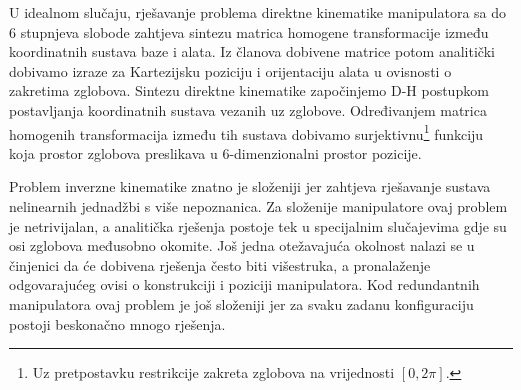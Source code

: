 \documentclass[times, utf8, diplomski, numeric]{fer}
\begin{document}
U idealnom slučaju, rješavanje problema direktne kinematike manipulatora sa do 6 stupnjeva slobode zahtjeva sintezu matrica homogene transformacije između koordinatnih sustava baze i alata.
Iz članova dobivene matrice potom analitički dobivamo izraze za Kartezijsku poziciju i orijentaciju alata u ovisnosti o zakretima zglobova.
Sintezu direktne kinematike započinjemo D-H postupkom \cite{uicker1964iterative} postavljanja koordinatnih sustava vezanih uz zglobove.
Određivanjem matrica homogenih transformacija između tih sustava dobivamo surjektivnu\footnote{Uz pretpostavku restrikcije zakreta zglobova na vrijednosti $[0,2\pi]$.} funkciju koja prostor zglobova preslikava u 6-dimenzionalni prostor pozicije.

Problem inverzne kinematike znatno je složeniji jer zahtjeva rješavanje sustava nelinearnih jednadžbi s više nepoznanica.
Za složenije manipulatore  ovaj problem je netrivijalan, a analitička rješenja postoje tek u specijalnim slučajevima gdje su osi zglobova međusobno okomite.
Još jedna otežavajuća okolnost nalazi se u činjenici da će dobivena rješenja često biti višestruka, a pronalaženje odgovarajućeg ovisi o konstrukciji i poziciji manipulatora.
Kod redundantnih manipulatora ovaj problem je još složeniji jer za svaku zadanu konfiguraciju postoji beskonačno mnogo rješenja.
\end{document}
